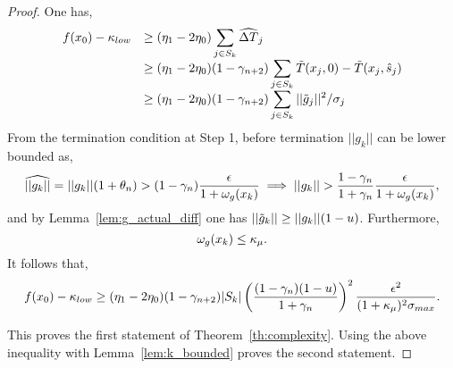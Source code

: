 \documentclass{article}[12pt]
\begin{document}
	\begin{proof}
		One has,
		\begin{equation}
			\begin{array}{ll}
				f(x_0) - \kappa_{low} & \geq (\eta_1-2\eta_0)\displaystyle\sum_{j\in S_k}\widehat{\Delta T}_j\\
				& \geq (\eta_1-2\eta_0)(1-\gamma_{n+2})\displaystyle\sum_{j\in S_k}\tilde{T}(x_j,0)-\tilde{T}(x_j,\hat{s}_{j})\\
				& \geq (\eta_1-2\eta_0)(1-\gamma_{n+2})\displaystyle\sum_{j\in S_k}||\tilde{g}_j||^2/\sigma_j\\
			\end{array}
		\end{equation} 
	From the termination condition at Step 1, before termination $||g_k||$ can be lower bounded as,
	\begin{equation}
		\widehat{||g_k||} = ||g_k||(1+\theta_n) > (1-\gamma_n)\dfrac{\epsilon}{1+\omega_g(x_k)} \implies ||g_k|| > \dfrac{1-\gamma_n}{1+\gamma_n} \dfrac{\epsilon}{1+\omega_g(x_k)},
	\end{equation}
	and by Lemma~\ref{lem:g_actual_diff} one has $||\tilde{g}_k||\geq ||g_k|| (1-u)$.
	Furthermore,
	\begin{equation}
		\omega_g(x_k) \leq \kappa_\mu.
	\end{equation}
	It follows that,
	\begin{equation}
		f(x_0) - \kappa_{low} \geq (\eta_1-2\eta_0)(1-\gamma_{n+2})|S_k|\left(\dfrac{(1-\gamma_n)(1-u)}{1+\gamma_n}\right)^2\dfrac{\epsilon^2}{(1+\kappa_\mu)^2\sigma_{max}}.\\
	\end{equation}
		

	This proves the first statement of Theorem~\ref{th:complexity}. Using the above inequality with Lemma~\ref{lem:k_bounded} proves the second statement.
	\end{proof}
\end{document}
